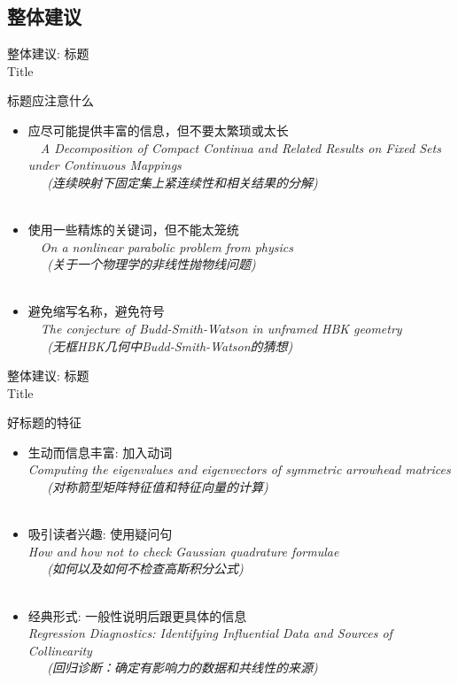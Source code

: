 \documentclass[UTF8]{ctexbeamer}
\begin{document}
\subsection{整体建议}
\begin{frame}{整体建议: 标题 \\ Title}
\begin{alertblock}{标题应注意什么}
\begin{itemize}
    \item 应尽可能提供丰富的信息，但不要太繁琐或太长 \\
    \XSolidBrush \ \ \textit{A Decomposition of Compact Continua and Related Results on Fixed Sets under Continuous Mappings \\ \ \ \  (连续映射下固定集上紧连续性和相关结果的分解)} \\ \ \\
    \item 使用一些精炼的关键词，但不能太笼统 \\
    \XSolidBrush \ \ \textit{On a nonlinear parabolic problem from physics \\ \ \ \  (关于一个物理学的非线性抛物线问题)}\\ \ \\
    \item 避免缩写名称，避免符号 \\
    \XSolidBrush \ \ \textit{The conjecture of Budd-Smith-Watson in unframed HBK geometry  \\ \ \ \ (无框HBK几何中Budd-Smith-Watson的猜想)}
\end{itemize}
\end{alertblock}
\end{frame}

\begin{frame}{整体建议: 标题 \\ Title}
\begin{alertblock}{好标题的特征}
\begin{itemize}
    \item 生动而信息丰富: 加入动词 \\ \Checkmark \textit{Computing the eigenvalues and eigenvectors of symmetric arrowhead matrices \\ \ \ \ (对称箭型矩阵特征值和特征向量的计算)} \\ \ \\
    \item 吸引读者兴趣: 使用疑问句 \\ \Checkmark \textit{How and how not to check Gaussian quadrature formulae \\ \ \ \ (如何以及如何不检查高斯积分公式)} \\ \ \\
    \item 经典形式: 一般性说明后跟更具体的信息 \\ \Checkmark \textit{Regression Diagnostics: Identifying Influential Data and Sources of Collinearity \\  \ \ \ (回归诊断：确定有影响力的数据和共线性的来源)}
\end{itemize}
\end{alertblock}
\end{frame}
\end{document}
